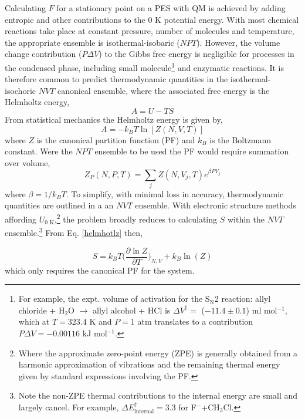 \documentclass[../main.tex]{subfiles}
\begin{document}
Calculating $F$ for a stationary point on a PES with QM is achieved by adding  entropic and other contributions to the 0 K potential energy. With most chemical reactions take place at constant pressure, number of molecules and temperature, the appropriate ensemble is isothermal-isobaric ($NPT$). However, the volume change contribution ($P\Delta V$) to the Gibbs free energy is negligible for processes in the condensed phase, including small molecule\footnote{For example, the expt. \cite{Lateef1969} volume of activation for the S$_\text{N}$2 reaction: allyl chloride + H$_2$O $\rightarrow$ allyl alcohol + HCl is $\Delta V^\ddagger = $ ($-11.4 \pm 0.1$) ml mol$^{-1}$, which at $T = 323.4$ K and $P = $1 atm translates to a contribution $P\Delta V = -0.00116$ kJ mol$^{-1}$.} and enzymatic reactions.\cite{Low1975} It is therefore common to predict thermodynamic quantities in the isothermal-isochoric $NVT$ canonical ensemble, where the associated free energy is the Helmholtz energy,
\begin{equation}
A = U - TS
\end{equation} 
From statistical mechanics the Helmholtz energy is given by,\cite{mcquarrie200}
\begin{equation}
A = -k_B T \ln[Z(N, V, T)]
\label{helmhotlz}
\end{equation}
where $Z$ is the canonical partition function (PF) and $k_B$ is the Boltzmann constant. Were the $NPT$ ensemble to be used the PF would require summation over volume, 
\begin{equation}
Z_P(N, P, T) =  \sum_j Z(N, V_j, T) e^{\beta P V_j}
\end{equation}
where $\beta = 1 / k_B T$. To simplify, with minimal loss in accuracy, thermodynamic quantities are outlined in a an $NVT$ ensemble. With electronic structure methods affording $U_{0\text{ K}}$,\footnote{Where the approximate zero-point energy (ZPE) is generally obtained from a harmonic approximation of vibrations and the remaining thermal energy given by standard expressions involving the PF.} the problem broadly reduces to calculating $S$ within the $NVT$ ensemble.\footnote{Note the non-ZPE thermal contributions to the internal energy are small and largely cancel. For example, $\Delta E_\text{internal}^\ddagger = 3.3$ \kcalx for F${}^{-}$+CH${}_3$Cl.} From Eq. \ref{helmhotlz} then,

\begin{equation}
S = k_B T {\Big (} \frac{\partial \ln Z}{\partial T} {\Big )}_{N, V} + k_B \ln(Z)
\label{entropy_Z}
\end{equation}
which only requires the canonical PF for the system.
\end{document}
